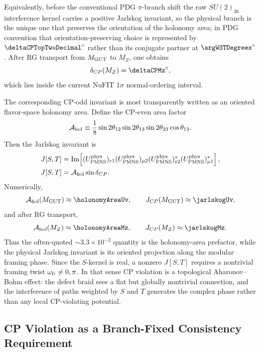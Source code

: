 \documentclass[11pt]{article}
\newcommand{\Ahol}{\mathcal{A}_{\rm hol}}
\begin{document}
Equivalently, before the conventional PDG $\pi$-branch shift the raw $SU(2)_{26}$ interference kernel carries a positive Jarlskog invariant, so the physical branch is the unique one that preserves the orientation of the holonomy area; in PDG convention that orientation-preserving choice is represented by $\deltaCPTopTwoDecimal^{\circ}$ rather than its conjugate partner at $\argWSTDegrees^{\circ}$.
After RG transport from $M_{\rm GUT}$ to $M_Z$, one obtains
\begin{equation}
 \delta_{CP}(M_Z)=\deltaCPMz^{\circ},
\end{equation}
which lies inside the current NuFIT $1\sigma$ normal-ordering interval.

The corresponding CP-odd invariant is most transparently written as an oriented flavor-space holonomy area. Define the CP-even area factor
\begin{equation}
 \Ahol
 \equiv
 \frac18\sin2\theta_{12}\sin2\theta_{13}\sin2\theta_{23}\cos\theta_{13}.
\end{equation}
Then the Jarlskog invariant is
\begin{align}
 J[S,T]
 &= \Im\!\left[(U_{\rm PMNS}^{\rm phys})_{e1}(U_{\rm PMNS}^{\rm phys})_{\mu2}(U_{\rm PMNS}^{\rm phys})_{e2}^{*}(U_{\rm PMNS}^{\rm phys})_{\mu1}^{*}\right], \\
 J[S,T]
 &= \Ahol\sin\delta_{CP}.
\end{align}
Numerically,
\begin{equation}
 \Ahol(M_{\rm GUT})\approx\holonomyAreaUv,
 \qquad
 J_{CP}(M_{\rm GUT})\approx\jarlskogUv,
\end{equation}
and after RG transport,
\begin{equation}
 \Ahol(M_Z)\approx\holonomyAreaMz,
 \qquad
 J_{CP}(M_Z)\approx\jarlskogMz.
\end{equation}
Thus the often-quoted $\sim3.3\times10^{-2}$ quantity is the holonomy-area prefactor, while the physical Jarlskog invariant is its oriented projection along the modular framing phase. Since the $S$-kernel is real, a nonzero $J[S,T]$ requires a nontrivial framing twist $\omega_{\rm fr}\neq0,\pi$. In that sense CP violation is a topological Aharonov--Bohm effect: the defect braid sees a flat but globally nontrivial connection, and the interference of paths weighted by $S$ and $T$ generates the complex phase rather than any local CP-violating potential.

\subsection{CP Violation as a Branch-Fixed Consistency Requirement}
\end{document}
